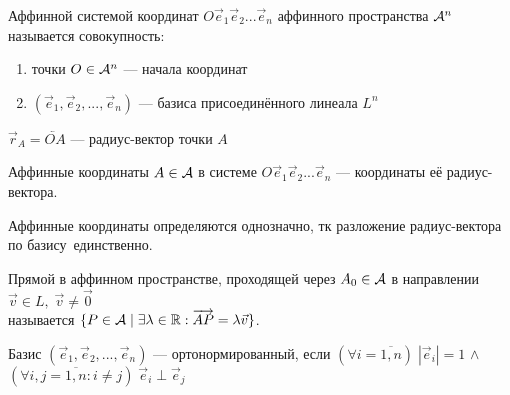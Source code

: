 \documentclass{article}
\begin{document}

Аффинной системой координат $O\vec{e}_1\vec{e}_2...\vec{e}_{n}$ аффинного пространства $\mathcal{A}^{n}$ называется совокупность:
\begin{enumerate}
	\item{}точки $O\in\mathcal{A}^{n}$ --- начала координат
	\item{}$(\vec{e}_1,\vec{e}_2,...,\vec{e}_{n})$ --- базиса присоединённого линеала $L^{n}$
\end{enumerate}

$\vec{r}_A=\lvec{OA}$ --- радиус-вектор точки $A$

\vspace{2em}
\begin{minipage}{0.5\linewidth}
	\centering
\end{minipage}%
\begin{minipage}{0.5\linewidth}
	\centering
\end{minipage}

\pagebreak


Аффинные координаты $A\in\mathcal{A}$ в системе $O\vec{e}_1\vec{e}_2...\vec{e}_{n}$ --- координаты её радиус-вектора.

Аффинные координаты определяются однозначно, тк разложение радиус-вектора по базису~единственно.


Прямой в аффинном пространстве, проходящей через $A_0\in\mathcal{A}$ в направлении $\vec{v}\in L,\;\vec{v}\neq \vec{0}$\\
называется $\{P\in\mathcal{A}\;|\;\exists\lambda\in\mathbb{R}:\overrightarrow{AP}=\lambda\vec{v}\}$.


Базис $(\vec{e}_1,\vec{e}_2,...,\vec{e}_{n})$ --- ортонормированный, если
$(\forall i=\overline{1,n})\;|\vec{e}_{i}|=1$ $\land$ $(\forall i,j=\overline{1,n}:i\neq j)\;\vec{e}_{i}\perp\vec{e}_{j}$
\end{document}
